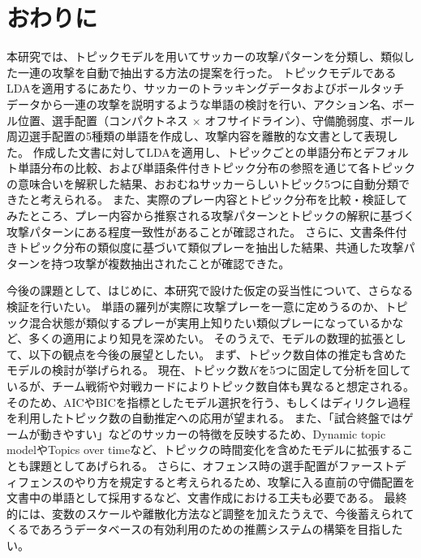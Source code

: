 \section{おわりに}
\label{sec:owarini}

本研究では、トピックモデルを用いてサッカーの攻撃パターンを分類し、類似した一連の攻撃を自動で抽出する方法の提案を行った。
トピックモデルであるLDAを適用するにあたり、サッカーのトラッキングデータおよびボールタッチデータから一連の攻撃を説明するような単語の検討を行い、アクション名、ボール位置、選手配置（コンパクトネス × オフサイドライン）、守備脆弱度、ボール周辺選手配置の5種類の単語を作成し、攻撃内容を離散的な文書として表現した。
作成した文書に対してLDAを適用し、トピックごとの単語分布とデフォルト単語分布の比較、および単語条件付きトピック分布の参照を通じて各トピックの意味合いを解釈した結果、おおむねサッカーらしいトピック5つに自動分類できたと考えられる。
また、実際のプレー内容とトピック分布を比較・検証してみたところ、プレー内容から推察される攻撃パターンとトピックの解釈に基づく攻撃パターンにある程度一致性があることが確認された。
さらに、文書条件付きトピック分布の類似度に基づいて類似プレーを抽出した結果、共通した攻撃パターンを持つ攻撃が複数抽出されたことが確認できた。

今後の課題として、はじめに、本研究で設けた仮定の妥当性について、さらなる検証を行いたい。
単語の羅列が実際に攻撃プレーを一意に定めうるのか、トピック混合状態が類似するプレーが実用上知りたい類似プレーになっているかなど、多くの適用により知見を深めたい。
そのうえで、モデルの数理的拡張として、以下の観点を今後の展望としたい。
まず、トピック数自体の推定も含めたモデルの検討が挙げられる。
現在、トピック数$K$を5つに固定して分析を回しているが、チーム戦術や対戦カードによりトピック数自体も異なると想定される。
そのため、AICやBICを指標としたモデル選択を行う、もしくはディリクレ過程を利用したトピック数の自動推定への応用が望まれる。
また、「試合終盤ではゲームが動きやすい」などのサッカーの特徴を反映するため、Dynamic topic model\cite{dtm}やTopics over time\cite{tot}など、トピックの時間変化を含めたモデルに拡張することも課題としてあげられる。
さらに、オフェンス時の選手配置がファーストディフェンスのやり方を規定すると考えられるため、攻撃に入る直前の守備配置を文書中の単語として採用するなど、文書作成における工夫も必要である。
最終的には、変数のスケールや離散化方法など調整を加えたうえで、今後蓄えられてくるであろうデータベースの有効利用のための推薦システムの構築を目指したい。

